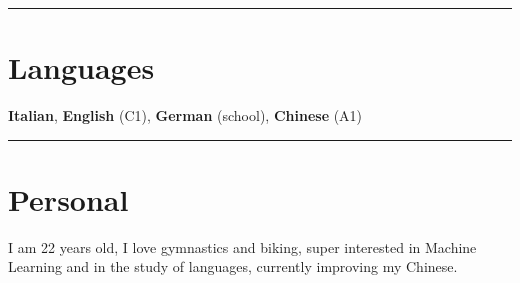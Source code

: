 \documentclass[10pt,a4paper,hidelinks]{article}
\makeatletter
\newenvironment{indentsection}[1]%
{\begin{list}{}%
	{\setlength{\leftmargin}{#1}}%
	\item[]%
}
{\end{list}}
\newcommand{\headerrow}[2]
{\begin{tabular*}{\linewidth}{l@{\extracolsep{\fill}}r}
	#1 &
	#2 \\
\end{tabular*}}
\makeatother
\begin{document}
%
%
%	
%



{\color{IFMediumGreen} \hrule}
\vspace{-0.3em}
{\color{IFDarkGreen}\section*{Languages}}

\begin{indentsection}{\parindent}
\begin{flushleft}
    \textbf{Italian}, \textbf{English} (C1), \textbf{German} (school), \textbf{Chinese} (A1)
\end{flushleft}
\end{indentsection}



{\color{IFMediumGreen} \hrule}
\vspace{-0.3em}
{\color{IFDarkGreen}\section*{Personal}}

\begin{indentsection}{\parindent}
\begin{flushleft}
I am 22 years old, I love gymnastics and biking, super interested in Machine Learning and in the study of languages, currently improving my Chinese.
\end{flushleft}
\end{indentsection}
\end{document}
